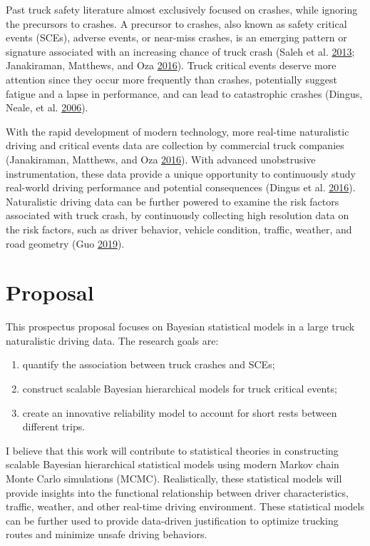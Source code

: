 \documentclass[12pt]{book}
\numberwithin{equation}{chapter}
\providecommand{\tightlist}{%
  \setlength{\itemsep}{0pt}\setlength{\parskip}{0pt}}
\begin{document}
Past truck safety literature almost exclusively focused on crashes, while ignoring the precursors to crashes. A precursor to crashes, also known as safety critical events (SCEs), adverse events, or near-miss crashes, is an emerging pattern or signature associated with an increasing chance of truck crash (Saleh et al. \protect\hyperlink{ref-saleh2013accident}{2013}; Janakiraman, Matthews, and Oza \protect\hyperlink{ref-janakiraman2016discovery}{2016}). Truck critical events deserve more attention since they occur more frequently than crashes, potentially suggest fatigue and a lapse in performance, and can lead to catastrophic crashes (Dingus, Neale, et al. \protect\hyperlink{ref-dingus2006development}{2006}).

With the rapid development of modern technology, more real-time naturalistic driving and critical events data are collection by commercial truck companies (Janakiraman, Matthews, and Oza \protect\hyperlink{ref-janakiraman2016discovery}{2016}). With advanced unobstrusive instrumentation, these data provide a unique opportunity to continuously study real-world driving performance and potential consequences (Dingus et al. \protect\hyperlink{ref-dingus2016driver}{2016}). Naturalistic driving data can be further powered to examine the risk factors associated with truck crash, by continuously collecting high resolution data on the risk factors, such as driver behavior, vehicle condition, traffic, weather, and road geometry (Guo \protect\hyperlink{ref-guo2019statistical}{2019}).

\hypertarget{proposal}{%
\section{Proposal}\label{proposal}}

This prospectus proposal focuses on Bayesian statistical models in a large truck naturalistic driving data. The research goals are:

\begin{enumerate}
\def\labelenumi{\arabic{enumi})}
\tightlist
\item
  quantify the association between truck crashes and SCEs;
\item
  construct scalable Bayesian hierarchical models for truck critical events;
\item
  create an innovative reliability model to account for short rests between different trips.
\end{enumerate}

I believe that this work will contribute to statistical theories in constructing scalable Bayesian hierarchical statistical models using modern Markov chain Monte Carlo simulations (MCMC). Realistically, these statistical models will provide insights into the functional relationship between driver characteristics, traffic, weather, and other real-time driving environment. These statistical models can be further used to provide data-driven justification to optimize trucking routes and minimize unsafe driving behaviors.
\end{document}
